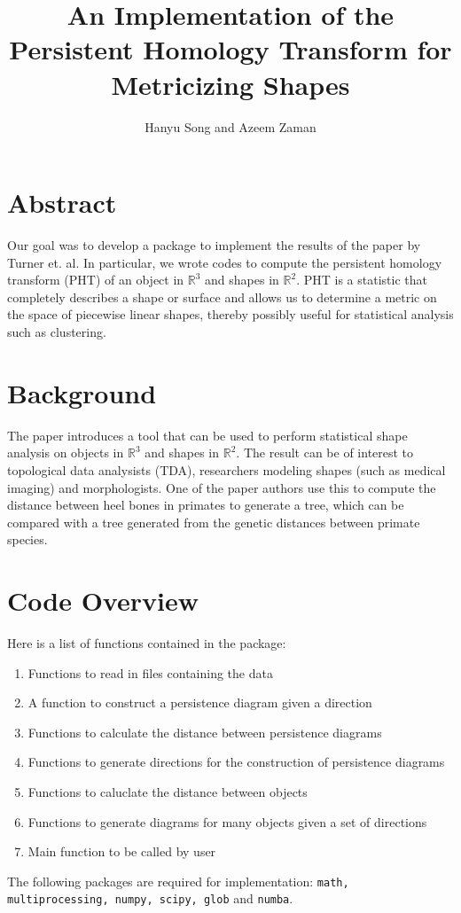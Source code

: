 \documentclass[11pt]{amsart}
\title{An Implementation of the Persistent Homology Transform for Metricizing Shapes}
\author{Hanyu Song and Azeem Zaman}
\begin{document}
\maketitle
\section{Abstract}
Our goal was to develop a package to implement the results of the paper by Turner et. al. In particular, we wrote codes to compute the persistent homology transform (PHT) of an object in $\mathbb{R}^3$ and shapes in $\mathbb{R}^2$. PHT is a statistic that completely describes a shape or surface and allows us to determine a metric on the space of piecewise linear shapes, thereby possibly useful for statistical analysis such as clustering. 


\section{Background}
The paper introduces a tool that can be used to perform statistical shape analysis on objects in $\mathbb{R}^3$ and shapes in $\mathbb{R}^2$.  The result can be of interest to topological data analysists (TDA), researchers modeling shapes (such as medical imaging) and morphologists. One of the paper authors use this to compute the distance between heel bones in primates to generate a tree, which can be compared with a tree generated from the genetic distances between primate species.  

\section{Code Overview}
Here is a list of functions contained in the package:
\begin{enumerate}
\item{Functions to read in files containing the data}
\item{A function to construct a persistence diagram given a direction}
\item{Functions to calculate the distance between persistence diagrams}
\item{Functions to generate directions for the construction of persistence diagrams}
\item{Functions to caluclate the distance between objects}
\item{Functions to generate diagrams for many objects given a set of directions}
\item{Main function to be called by user}
\end{enumerate}
The following packages are required for implementation: \texttt{math, multiprocessing, numpy, scipy, glob} and \texttt{numba}.
\end{document}
